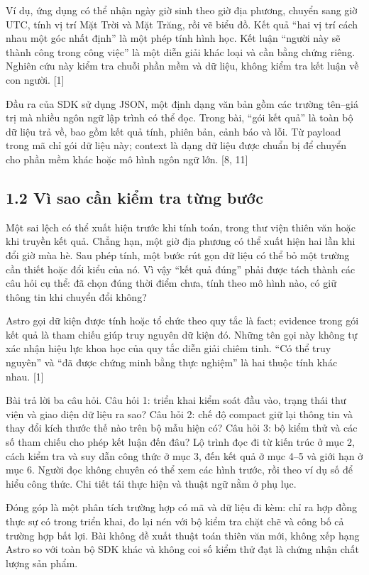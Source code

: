 \documentclass[11pt,a4paper]{article}
\begin{document}
Ví dụ, ứng dụng có thể nhận ngày giờ sinh theo giờ địa phương, chuyển sang giờ UTC, tính vị trí Mặt Trời và Mặt Trăng, rồi vẽ biểu đồ. Kết quả “hai vị trí cách nhau một góc nhất định” là một phép tính hình học. Kết luận “người này sẽ thành công trong công việc” là một diễn giải khác loại và cần bằng chứng riêng. Nghiên cứu này kiểm tra chuỗi phần mềm và dữ liệu, không kiểm tra kết luận về con người. [1]


Đầu ra của SDK sử dụng JSON, một định dạng văn bản gồm các trường tên–giá trị mà nhiều ngôn ngữ lập trình có thể đọc. Trong bài, “gói kết quả” là toàn bộ dữ liệu trả về, bao gồm kết quả tính, phiên bản, cảnh báo và lỗi. Từ payload trong mã chỉ gói dữ liệu này; context là dạng dữ liệu được chuẩn bị để chuyển cho phần mềm khác hoặc mô hình ngôn ngữ lớn. [8, 11]


\subsection*{1.2 Vì sao cần kiểm tra từng bước}
Một sai lệch có thể xuất hiện trước khi tính toán, trong thư viện thiên văn hoặc khi truyền kết quả. Chẳng hạn, một giờ địa phương có thể xuất hiện hai lần khi đổi giờ mùa hè. Sau phép tính, một bước rút gọn dữ liệu có thể bỏ một trường cần thiết hoặc đổi kiểu của nó. Vì vậy “kết quả đúng” phải được tách thành các câu hỏi cụ thể: đã chọn đúng thời điểm chưa, tính theo mô hình nào, có giữ thông tin khi chuyển đổi không?


Astro gọi dữ kiện được tính hoặc tổ chức theo quy tắc là fact; evidence trong gói kết quả là tham chiếu giúp truy nguyên dữ kiện đó. Những tên gọi này không tự xác nhận hiệu lực khoa học của quy tắc diễn giải chiêm tinh. “Có thể truy nguyên” và “đã được chứng minh bằng thực nghiệm” là hai thuộc tính khác nhau. [1]


Bài trả lời ba câu hỏi. Câu hỏi 1: triển khai kiểm soát đầu vào, trạng thái thư viện và giao diện dữ liệu ra sao? Câu hỏi 2: chế độ compact giữ lại thông tin và thay đổi kích thước thế nào trên bộ mẫu hiện có? Câu hỏi 3: bộ kiểm thử và các số tham chiếu cho phép kết luận đến đâu? Lộ trình đọc đi từ kiến trúc ở mục 2, cách kiểm tra và suy dẫn công thức ở mục 3, đến kết quả ở mục 4–5 và giới hạn ở mục 6. Người đọc không chuyên có thể xem các hình trước, rồi theo ví dụ số để hiểu công thức. Chi tiết tái thực hiện và thuật ngữ nằm ở phụ lục.


Đóng góp là một phân tích trường hợp có mã và dữ liệu đi kèm: chỉ ra hợp đồng thực sự có trong triển khai, đo lại nén với bộ kiểm tra chặt chẽ và công bố cả trường hợp bất lợi. Bài không đề xuất thuật toán thiên văn mới, không xếp hạng Astro so với toàn bộ SDK khác và không coi số kiểm thử đạt là chứng nhận chất lượng sản phẩm.
\end{document}
